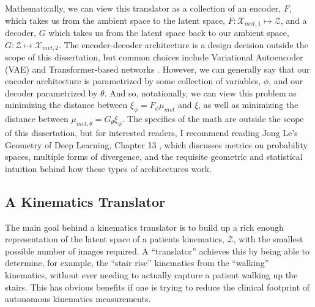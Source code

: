 Mathematically, we can view this translator as a collection of an encoder, $F$, which takes us from the ambient space to the latent space, $F: \mathcal{X}_{mvt,1} \mapsto \mathcal{Z}$, and a decoder, $G$ which takes us from the latent space back to our ambient space, $G: \mathcal{Z} \mapsto \mathcal{X}_{mvt,2}$. The encoder-decoder architecture is a design decision outside the scope of this dissertation, but common choices include Variational Autoencoder (VAE) and Transformer-based networks \cite{vaswaniAttentionAllYou2017}.
However, we can generally say that our encoder architecture is parametrized by some collection of variables, $\phi$, and our decoder parametrized by $\theta$.
And so, notationally, we can view this problem as minimizing the distance between $\xi_{\phi} = F_{\phi}\mu_{mvt}$ and $\xi$, as well as minimizing the distance between $\mu_{mvt,\theta} = G_{\theta}\xi_{\phi}$.
The specifics of the math are outside the scope of this dissertation, but for interested readers, I recommend reading Jong Le's Geometry of Deep Learning, Chapter 13 \cite{yeGeometryDeepLearning2022}, which discusses metrics on probability spaces, multiple forms of divergence, and the requisite geometric and statistical intuition behind how these types of architectures work.

\subsection{A Kinematics Translator}
The main goal behind a kinematics translator is to build up a rich enough representation of the latent space of a patients kinematics, $\mathcal{Z}$, with the smallest possible number of images required.
A ``translator'' achieves this by being able to determine, for example, the ``stair rise'' kinematics from the ``walking'' kinematics, without ever needing to actually capture a patient walking up the stairs.
This has obvious benefits if one is trying to reduce the clinical footprint of autonomous kinematics measurements.

